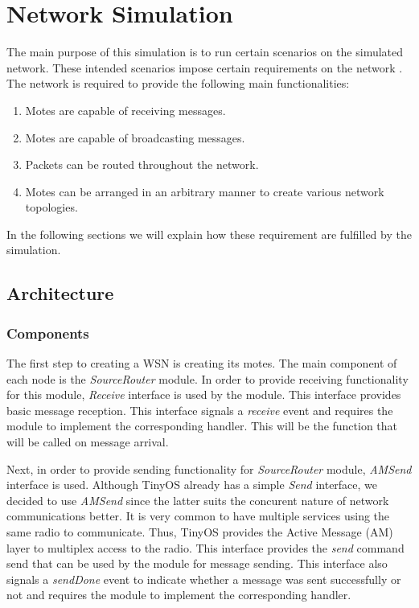 \documentclass[11pt, titlepage, oneside]{article}
\begin{document}
\section{Network Simulation} 
 
The main purpose of this simulation is to run certain scenarios on the simulated network. These intended scenarios impose certain requirements on the network . The network is required to provide the following main functionalities: 
\begin{enumerate} 
\item Motes are capable of receiving messages. 
\item Motes are capable of broadcasting messages. 
\item Packets can be routed throughout the network. 
\item Motes can be arranged in an arbitrary manner to create various network topologies.
\end{enumerate} 
In the following sections we will explain how these requirement are fulfilled by the simulation. 
\subsection{Architecture} \label{arch}
\subsubsection{Components}
The first step to creating a WSN is creating its motes. The main component of each node is the {\it SourceRouter} module. In order to provide receiving functionality for this module, {\it Receive} interface is used by the module. This interface provides basic message reception. This interface signals a {\it receive} event and requires the module to implement the corresponding handler. This will be the function that will be called on message arrival. 
 
	Next, in order to provide sending functionality for {\it SourceRouter} module, {\it AMSend} interface is used. Although TinyOS already has a simple {\it Send} interface, we decided to use {\it AMSend} since the latter suits the concurent nature of network communications better. It is very common to have multiple services using the same radio to communicate. Thus, TinyOS provides the Active Message (AM) layer to multiplex access to the radio. This interface provides the {\it send} command send that can be used by the module for message sending. This interface also signals a {\it sendDone} event to indicate whether a message was sent successfully or not and requires the module to implement the corresponding handler. 
 
\end{document}
